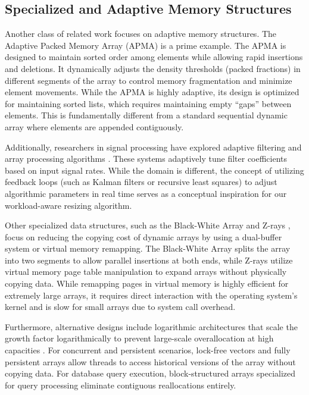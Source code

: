 \subsection{Specialized and Adaptive Memory Structures}
Another class of related work focuses on adaptive memory structures. The Adaptive 
Packed Memory Array (APMA) \cite{adaptive_packed} is a prime example. The APMA 
is designed to maintain sorted order among elements while allowing rapid 
insertions and deletions. It dynamically adjusts the density thresholds (packed 
fractions) in different segments of the array to control memory fragmentation 
and minimize element movements. While the APMA is highly adaptive, its design 
is optimized for maintaining sorted lists, which requires maintaining empty 
``gaps'' between elements. This is fundamentally different from a standard 
sequential dynamic array where elements are appended contiguously.

Additionally, researchers in signal processing have explored adaptive filtering and 
array processing algorithms \cite{trends_adaptive}. These systems adaptively 
tune filter coefficients based on input signal rates. While the domain is 
different, the concept of utilizing feedback loops (such as Kalman filters or 
recursive least squares) to adjust algorithmic parameters in real time serves 
as a conceptual inspiration for our workload-aware resizing algorithm.

Other specialized data structures, such as the Black-White Array \cite{black_white_array} 
and Z-rays \cite{z_rays}, focus on reducing the copying cost of dynamic arrays 
by using a dual-buffer system or virtual memory remapping. The Black-White 
Array splits the array into two segments to allow parallel insertions at both 
ends, while Z-rays utilize virtual memory page table manipulation to expand 
arrays without physically copying data. While remapping pages in virtual memory 
is highly efficient for extremely large arrays, it requires direct interaction 
with the operating system's kernel and is slow for small arrays due to system 
call overhead.

Furthermore, alternative designs include logarithmic architectures that scale 
the growth factor logarithmically to prevent large-scale overallocation at 
high capacities \cite{logarithmic_arrays}. For concurrent and persistent 
scenarios, lock-free vectors \cite{lock_free_vector} and fully persistent 
arrays \cite{persistent_arrays} allow threads to access historical versions 
of the array without copying data. For database query execution, 
block-structured arrays specialized for query processing 
\cite{query_processing} eliminate contiguous reallocations entirely.

